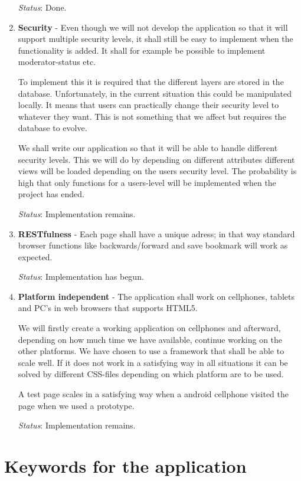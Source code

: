 \documentclass[a4paper, 12pt, titlepage]{article}
\begin{document}
\begin{enumerate}
	\textit{Status}: Done.

	\item  \textbf{Security} -
	Even though we will not develop the application so that it will support multiple security levels, it shall still be easy to implement when the functionality is added. It shall for example be possible to implement moderator-status etc.
	
	To implement this it is required that the different layers are stored in the database. Unfortunately, in the current situation this could be manipulated locally. It means that users can practically change their security level to whatever they want. This is not something that we affect but requires the database to evolve. 

	We shall write our application so that it will be able to handle different security levels. This we will do by depending on different attributes different views will be loaded depending on the users security level. The probability is high that only functions for a users-level will be implemented when the project has ended.
  
	\textit{Status}: Implementation remains.
	
	\item \textbf{RESTfulness} -
	Each page shall have a unique adress; in that way standard browser functions like backwards/forward and save bookmark will work as expected.
	
	\textit{Status}: Implementation has begun.
	
	
	\item \textbf{Platform independent} -
	The application shall work on cellphones, tablets and PC's in web browsers that supports HTML5.

	We will firstly create a working application on cellphones and afterward, depending on how much time we have available, continue working on the other platforms. We have chosen to use a framework that shall be able to scale well. If it does not work in a satisfying way in all situations it can be solved by different CSS-files depending on which platform are to be used.

	A test page scales in a satisfying way when a android cellphone visited the page when we used a prototype.

	
	\textit{Status}: Implementation remains.
	\cbend

	
\end{enumerate}

\section{Keywords for the application}
\end{document}

